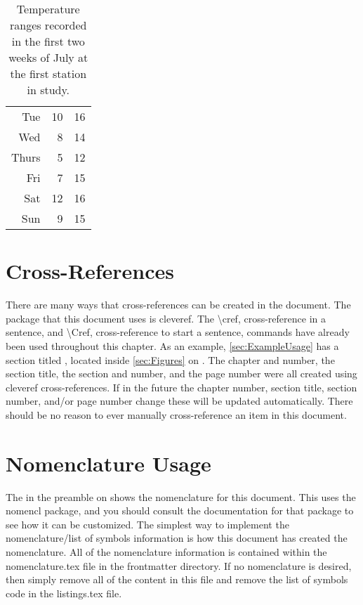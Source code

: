 \begin{table}
\begin{subtable}[h]{0.375\textwidth}
\begin{tabular}{r r r}
                Tue   & 10 & 16 \\
                Wed   & 8  & 14 \\
                Thurs & 5  & 12 \\
                Fri   & 7  & 15 \\
                Sat   & 12 & 16 \\
                Sun   & 9  & 15 \\
                \hline
            \end{tabular}
        \end{subtable}
        \caption{Temperature ranges recorded in the first two weeks of July at the first station in study.}
        \label{tab:temps}
    \end{table}

\section{Cross-References} \label{sec:CrossReferences}
    There are many ways that cross-references can be created in the document.
    The package that this document uses is cleveref.
    The \textbackslash cref, cross-reference in a sentence, and \textbackslash Cref, cross-reference to start a sentence, commands have already been used throughout this chapter.
    As an example, \cref{sec:ExampleUsage} has a section titled , located inside \cref{sec:Figures} on .
    The chapter and number, the section title, the section and number, and the page number were all created using cleveref cross-references.
    If in the future the chapter number, section title, section number, and/or page number change these will be updated automatically.
    There should be no reason to ever manually cross-reference an item in this document.

\section{Nomenclature Usage} \label{sec:NomenclatureUsage}
    The  in the preamble on  shows the nomenclature for this document.
    This uses the nomencl package, and you should consult the documentation for that package to see how it can be customized.
    The simplest way to implement the nomenclature/list of symbols information is how this document has created the nomenclature.
    All of the nomenclature information is contained within the nomenclature.tex file in the frontmatter directory.
    If no nomenclature is desired, then simply remove all of the content in this file and remove the list of symbols code in the listings.tex file.


